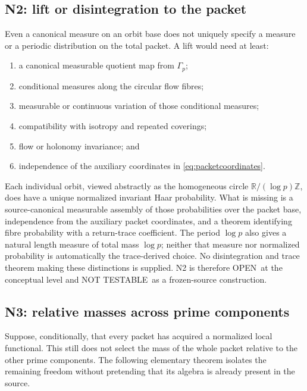\documentclass[11pt]{article}
\theoremstyle{definition}
\theoremstyle{remark}
\newcommand{\R}{\mathbb{R}}
\newcommand{\Z}{\mathbb{Z}}
\newcommand{\openclaim}{\textsf{OPEN}}
\newcommand{\nottest}{\textsf{NOT TESTABLE}}
\begin{document}
\subsection{N2: lift or disintegration to the packet}

Even a canonical measure on an orbit base does not uniquely specify a measure
or a periodic distribution on the total packet.  A lift would need at least:
\begin{enumerate}[leftmargin=*,itemsep=2pt]
 \item a canonical measurable quotient map from \(\Gamma_p\);
 \item conditional measures along the circular flow fibres;
 \item measurable or continuous variation of those conditional measures;
 \item compatibility with isotropy and repeated coverings;
 \item flow or holonomy invariance; and
 \item independence of the auxiliary coordinates in
 \eqref{eq:packetcoordinates}.
\end{enumerate}
Each individual orbit, viewed abstractly as the homogeneous circle
\(\R/(\log p)\Z\), does have a unique normalized invariant Haar probability.
What is missing is a source-canonical measurable assembly of those
probabilities over the packet base, independence from the auxiliary packet
coordinates, and a theorem identifying fibre probability with a return-trace
coefficient.  The period \(\log p\) also gives a natural length measure of
total mass \(\log p\); neither that measure nor normalized probability is
automatically the trace-derived choice.  No disintegration and trace theorem
making these distinctions is supplied.  N2 is therefore \openclaim\ at the
conceptual level and \nottest\ as a frozen-source construction.

\subsection{N3: relative masses across prime components}

Suppose, conditionally, that every packet has acquired a normalized local
functional.  This still does not select the mass of the whole packet relative
to the other prime components.  The following elementary theorem isolates the
remaining freedom without pretending that its algebra is already present in
the source.
\end{document}
